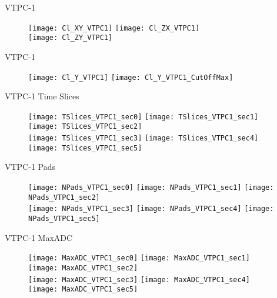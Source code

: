 \documentclass[11pt]{beamer}
\begin{document}
\begin{frame}{VTPC-1}
\begin{figure}
\centering
\texttt{[image: Cl\_XY\_VTPC1]}
\texttt{[image: Cl\_ZX\_VTPC1]}\\
\texttt{[image: Cl\_ZY\_VTPC1]}
\end{figure}
\end{frame}

\begin{frame}{VTPC-1}
\begin{figure}
\centering
\texttt{[image: Cl\_Y\_VTPC1]}
\texttt{[image: Cl\_Y\_VTPC1\_CutOffMax]}
\end{figure}
\end{frame}



\begin{frame}{VTPC-1 Time Slices}
\begin{figure}
\centering
\texttt{[image: TSlices\_VTPC1\_sec0]}
\texttt{[image: TSlices\_VTPC1\_sec1]}
\texttt{[image: TSlices\_VTPC1\_sec2]}\\
\texttt{[image: TSlices\_VTPC1\_sec3]}
\texttt{[image: TSlices\_VTPC1\_sec4]}
\texttt{[image: TSlices\_VTPC1\_sec5]}
\end{figure}
\end{frame}

\begin{frame}{VTPC-1 Pads}
\begin{figure}
\centering
\texttt{[image: NPads\_VTPC1\_sec0]}
\texttt{[image: NPads\_VTPC1\_sec1]}
\texttt{[image: NPads\_VTPC1\_sec2]}\\
\texttt{[image: NPads\_VTPC1\_sec3]}
\texttt{[image: NPads\_VTPC1\_sec4]}
\texttt{[image: NPads\_VTPC1\_sec5]}
\end{figure}
\end{frame}

\begin{frame}{VTPC-1 MaxADC}
\begin{figure}
\centering
\texttt{[image: MaxADC\_VTPC1\_sec0]}
\texttt{[image: MaxADC\_VTPC1\_sec1]}
\texttt{[image: MaxADC\_VTPC1\_sec2]}\\
\texttt{[image: MaxADC\_VTPC1\_sec3]}
\texttt{[image: MaxADC\_VTPC1\_sec4]}
\texttt{[image: MaxADC\_VTPC1\_sec5]}
\end{figure}
\end{frame}
\end{document}
